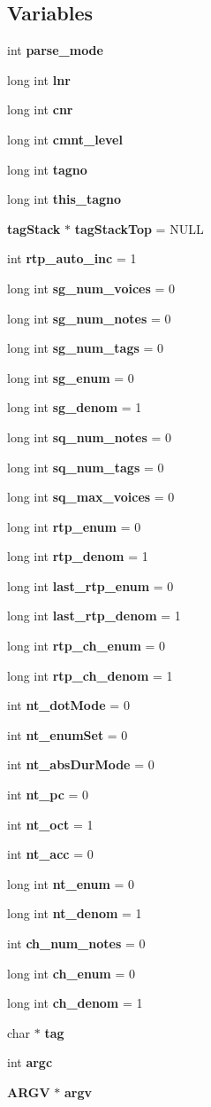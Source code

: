 \subsection*{Variables}
\begin{CompactItemize}
\item 
int {\bf parse\_\-mode}
\item 
long int {\bf lnr}
\item 
long int {\bf cnr}
\item 
long int {\bf cmnt\_\-level}
\item 
long int {\bf tagno}
\item 
long int {\bf this\_\-tagno}
\item 
{\bf tag\-Stack} $\ast$ {\bf tag\-Stack\-Top} = NULL
\item 
int {\bf rtp\_\-auto\_\-inc} = 1
\item 
long int {\bf sg\_\-num\_\-voices} = 0
\item 
long int {\bf sg\_\-num\_\-notes} = 0
\item 
long int {\bf sg\_\-num\_\-tags} = 0
\item 
long int {\bf sg\_\-enum} = 0
\item 
long int {\bf sg\_\-denom} = 1
\item 
long int {\bf sq\_\-num\_\-notes} = 0
\item 
long int {\bf sq\_\-num\_\-tags} = 0
\item 
long int {\bf sq\_\-max\_\-voices} = 0
\item 
long int {\bf rtp\_\-enum} = 0
\item 
long int {\bf rtp\_\-denom} = 1
\item 
long int {\bf last\_\-rtp\_\-enum} = 0
\item 
long int {\bf last\_\-rtp\_\-denom} = 1
\item 
long int {\bf rtp\_\-ch\_\-enum} = 0
\item 
long int {\bf rtp\_\-ch\_\-denom} = 1
\item 
int {\bf nt\_\-dot\-Mode} = 0
\item 
int {\bf nt\_\-enum\-Set} = 0
\item 
int {\bf nt\_\-abs\-Dur\-Mode} = 0
\item 
int {\bf nt\_\-pc} = 0
\item 
int {\bf nt\_\-oct} = 1
\item 
int {\bf nt\_\-acc} = 0
\item 
long int {\bf nt\_\-enum} = 0
\item 
long int {\bf nt\_\-denom} = 1
\item 
int {\bf ch\_\-num\_\-notes} = 0
\item 
long int {\bf ch\_\-enum} = 0
\item 
long int {\bf ch\_\-denom} = 1
\item 
char $\ast$ {\bf tag}
\item 
int {\bf argc}
\item 
{\bf ARGV} $\ast$ {\bf argv}
\end{CompactItemize}


